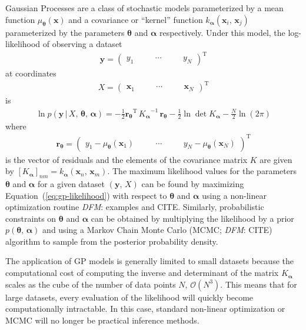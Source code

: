 \documentclass[manuscript, letterpaper]{aastex6}
\renewcommand{\eqref}[1]{\ref{eq:#1}}
\newcommand{\Eq}[1]{Equation~(\eqref{#1})}
\newcommand{\eq}[1]{\Eq{#1}}
\newcommand{\eqlabel}[1]{\label{eq:#1}}
\newcommand{\T}{\ensuremath{\mathrm{T}}}
\newcommand{\bvec}[1]{{\ensuremath{\boldsymbol{#1}}}}
\newcommand{\todo}[3]{{\color{#2}\emph{#1}: #3}}
\newcommand{\dfmtodo}[1]{\todo{DFM}{red}{#1}}
\begin{document}
Gaussian Processes \citep[GPs;][]{Rasmussen:2006} are a class of stochastic
models parameterized by a mean function $\mu_\bvec{\theta}(\bvec{x})$ and a
covariance or ``kernel'' function $k_\bvec{\alpha}(\bvec{x}_i,\,\bvec{x}_j)$
parameterized by the parameters $\bvec{\theta}$ and $\bvec{\alpha}$
respectively.
Under this model, the log-likelihood of observing a dataset
\begin{eqnarray}
\bvec{y} = \left(\begin{array}{ccccc}
    y_1\quad && \cdots\quad && y_N
\end{array}\right)^\T
\end{eqnarray}
at coordinates
\begin{eqnarray}
X = \left(\begin{array}{ccccc}
    \bvec{x}_1\quad && \cdots\quad && \bvec{x}_N
\end{array}\right)^\T
\end{eqnarray}
is
\begin{eqnarray}\eqlabel{gp-likelihood}
\ln{p(\bvec{y}\,|\,{X,\,\bvec{\theta}},\,\bvec{\alpha})} =
    -\frac{1}{2} {\bvec{r}_\bvec{\theta}}^\T\,{K_\bvec{\alpha}}^{-1}\,
        \bvec{r}_\bvec{\theta}
    -\frac{1}{2}\ln\det K_\bvec{\alpha}
    - \frac{N}{2} \ln{(2\pi)}
\end{eqnarray}
where
\begin{eqnarray}
    \bvec{r}_\bvec{\theta} = \left(\begin{array}{ccccc}
    y_1 - \mu_\bvec{\theta}(\bvec{x}_1)\quad && \cdots\quad &&
    y_N - \mu_\bvec{\theta}(\bvec{x}_N)
\end{array}\right)^\T
\end{eqnarray}
is the vector of residuals and the elements of the covariance matrix $K$ are
given by $[K_\bvec{\alpha}]_{nm} = k_\bvec{\alpha}(\bvec{x}_n,\,\bvec{x}_m)$.
The maximum likelihood values for the parameters $\bvec{\theta}$ and
$\bvec{\alpha}$ for a given dataset $(\bvec{y},\,X)$ can be found by
maximizing \eq{gp-likelihood} with respect to $\bvec{\theta}$ and
$\bvec{\alpha}$ using a non-linear optimization routine \dfmtodo{examples and
CITE}.
Similarly, probabilistic constraints on $\bvec{\theta}$ and $\bvec{\alpha}$
can be obtained by multiplying the likelihood by a prior
$p(\bvec{\theta},\,\bvec{\alpha})$ and using a Markov Chain Monte Carlo (MCMC;
\dfmtodo{CITE}) algorithm to sample from the posterior probability density.

The application of GP models is generally limited to small datasets because
the computational cost of computing the inverse and determinant of the matrix
$K_\bvec{\alpha}$ scales as the cube of the number of data points $N$,
$\mathcal{O}(N^3)$.
This means that for large datasets, every evaluation of the likelihood will
quickly become computationally intractable.
In this case, standard non-linear optimization or MCMC will no longer be
practical inference methods.
\end{document}
